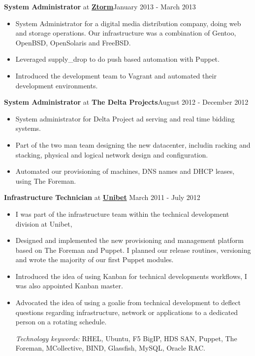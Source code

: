 \documentclass[8pt]{article}
\newenvironment{outerlist}[1][\enskip\textbullet]%
        {\begin{itemize}[#1]}{\end{itemize}%
         \vspace{-.6\baselineskip}}
\newcommand{\blankline}{\quad\pagebreak[2]}
\begin{document}
\textbf{System Administrator} at \href{http://www.ztorm.com}{\textbf{Ztorm}}\hfill {January 2013 - March 2013}
\begin{outerlist}
\item[] System Administrator for a digital media distribution company, doing web and storage operations. Our infrastructure was a
	combination of Gentoo, OpenBSD, OpenSolaris and FreeBSD.
	\item Leveraged supply\_drop to do push based automation with Puppet.
	\item Introduced the development team to Vagrant and automated their development environments.
\end{outerlist}
\blankline

\textbf{System Administrator} at {\textbf{The Delta Projects}}\hfill {August 2012 - December 2012}
\begin{outerlist}
\item[] System administrator for Delta Project ad serving and real time bidding systems. 
	\item Part of the two man team designing the new datacenter, includin racking and stacking, physical and logical network design and
		configuration.
	\item Automated our provisioning of machines, DNS names and DHCP leases, using The Foreman. 

\end{outerlist}
\blankline

\textbf{Infrastructure Technician} at \href{http://www.unibet.com}{\textbf{Unibet}}  \hfill {March 2011 - July 2012}
\begin{outerlist}
	\item[]I was part of the infrastructure team within the technical development division at Unibet, 
	 \item Designed and implemented the new provisioning and management platform based on The Foreman and Puppet. I planned our release routines, versioning and wrote the majority of our first Puppet modules.
	\item Introduced the idea of using Kanban for technical developments workflows, I was also appointed Kanban master.
	\item Advocated the idea of using a goalie from technical development to deflect questions regarding infrastructure, network or applications to a dedicated person on a rotating schedule.

\textit{Technology keywords:} RHEL, Ubuntu, F5 BigIP, HDS SAN, Puppet, The Foreman, MCollective, BIND, Glassfish, MySQL, Oracle RAC.
	
\end{outerlist}
\blankline
\end{document}
